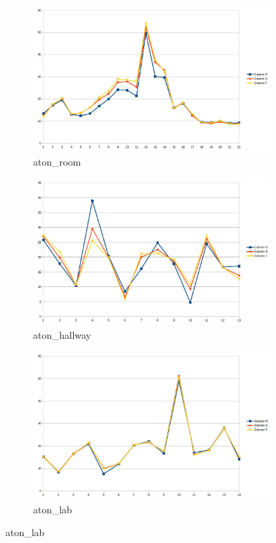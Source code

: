 \documentclass[12pt]{report}
\begin{document}
\begin{figure}
  \centering
  \begin{subfigure}{.49\linewidth}
 \includegraphics[width=1\linewidth]{figures/rgshift_room.jpg}
  \caption{aton\_room}
\end{subfigure}
\hfill
\begin{subfigure}{.49\linewidth}
 \includegraphics[width=1\linewidth]{figures/rgshift_hallway.jpg}
  \caption{aton\_hallway}
\end{subfigure}
\hfill
\begin{subfigure}{.7\linewidth}
 \includegraphics[width=1\linewidth]{figures/rgshift_lab.jpg}
  \caption{aton\_lab}
\end{subfigure}


\end{figure}
\end{document}
